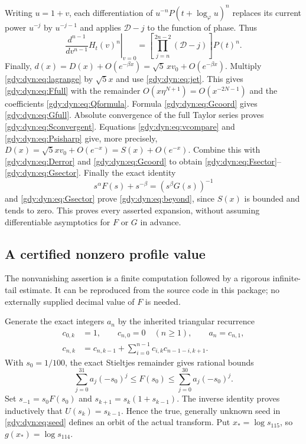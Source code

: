 \documentclass[11pt]{article}
\numberwithin{equation}{section}
\theoremstyle{definition}
\theoremstyle{remark}
\begin{document}
Writing $u=1+v$, each differentiation of
$u^{-n}P(t+\log_\varphi u)^n$ replaces its current power $u^{-j}$ by
$u^{-j-1}$ and applies $\mathcal D-j$ to the function of phase. Thus
\begin{equation}\label{gdy:dyn:eq:jet}
 \left.\frac{d^{n-1}}{dv^{n-1}}H_t(v)^n\right|_{v=0}
 =\left[\prod_{j=n}^{2n-2}(\mathcal D-j)\right]P(t)^n.
\end{equation}
Finally,
$d(x)=D(x)+O(e^{-\beta x})
      =\sqrt5\,xv_0+O(e^{-\beta x})$.
Multiply \eqref{gdy:dyn:eq:lagrange} by $\sqrt5x$ and use
\eqref{gdy:dyn:eq:jet}. This gives \eqref{gdy:dyn:eq:Ffull} with the remainder
$O(x\eta^{N+1})=O(x^{-2N-1})$ and the coefficients
\eqref{gdy:dyn:eq:Qformula}. Formula \eqref{gdy:dyn:eq:Gcoord} gives
\eqref{gdy:dyn:eq:Gfull}. Absolute convergence of the full Taylor series
proves \eqref{gdy:dyn:eq:Sconvergent}. Equations
\eqref{gdy:dyn:eq:vcompare} and \eqref{gdy:dyn:eq:Psisharp} give, more precisely,
$D(x)=\sqrt5xv_0+O(e^{-x})=S(x)+O(e^{-x})$. Combine this with
\eqref{gdy:dyn:eq:Derror} and \eqref{gdy:dyn:eq:Gcoord} to obtain
\eqref{gdy:dyn:eq:Fsector}--\eqref{gdy:dyn:eq:Gsector}. Finally the exact
identity
\[
 s^\alpha F(s)+s^{-\beta}=(s^\beta G(s))^{-1}
\]
and \eqref{gdy:dyn:eq:Gsector} prove \eqref{gdy:dyn:eq:beyond}, since $S(x)$
is bounded and tends to zero. This proves every asserted expansion,
without assuming differentiable asymptotics for $F$ or $G$ in advance.

\subsection{A certified nonzero profile value}
\label{gdy:dyn:sub:certificate}

The nonvanishing assertion is a finite computation followed by a
rigorous infinite-tail estimate. It can be reproduced from the source
code in this package; no externally supplied decimal value of $F$ is
needed.

Generate the exact integers $a_n$ by the inherited triangular recurrence
\begin{equation}\label{gdy:dyn:eq:momentrec}
 \begin{aligned}
 c_{0,k}&=1,\qquad c_{n,0}=0\quad(n\ge1),\qquad a_n=c_{n,1},\\
 c_{n,k}&=c_{n,k-1}+\sum_{i=0}^{n-1}c_{i,k}c_{n-1-i,k+1}.
 \end{aligned}
\end{equation}
With $s_0=1/100$, the exact Stieltjes remainder gives rational bounds
\begin{equation}\label{gdy:dyn:eq:seed}
 \sum_{j=0}^{31}a_j(-s_0)^j
 \le F(s_0)\le
 \sum_{j=0}^{30}a_j(-s_0)^j.
\end{equation}
Set $s_{-1}=s_0F(s_0)$ and
$s_{k+1}=s_k(1+s_{k-1})$. The inverse identity proves inductively that
$U(s_k)=s_{k-1}$. Hence the true, generally unknown seed in
\eqref{gdy:dyn:eq:seed} defines an orbit of the actual transform. Put
$x_*=\log s_{115}$, so $g(x_*)=\log s_{114}$.
\end{document}

